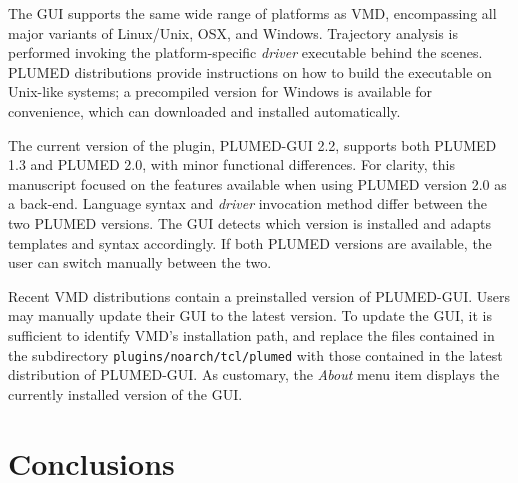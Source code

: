 \documentclass[preprint,review,11pt]{elsarticle}
\begin{document}
The GUI supports the same wide range of platforms as VMD, encompassing
all major variants of Linux/Unix, OSX, and Windows.  Trajectory
analysis is performed invoking the platform-specific \emph{driver}
executable behind the scenes. PLUMED distributions provide
instructions on how to build the executable on Unix-like systems; 
a precompiled version for Windows is available for convenience, which
can downloaded and installed automatically.

The current version of the plugin, PLUMED-GUI 2.2, supports both
PLUMED 1.3 and PLUMED 2.0, with minor functional differences.  For
clarity, this manuscript focused on the features available when using
PLUMED version 2.0 as a back-end.  Language syntax and \emph{driver}
invocation method differ between the two PLUMED versions.  The GUI
detects which version is installed and adapts templates and syntax
accordingly.  If both PLUMED versions are available, the user can
switch manually between the two.

Recent VMD distributions contain a preinstalled version of PLUMED-GUI.
Users may manually update their GUI to the latest version.  To update
the GUI, it is sufficient to identify VMD's installation path, and
replace the files contained in the subdirectory
\texttt{plugins/noarch/tcl/plumed} with those contained in the latest
distribution of PLUMED-GUI.  As customary, the \emph{About} menu item
displays the currently installed version of the GUI.


















\section{Conclusions}
\end{document}
